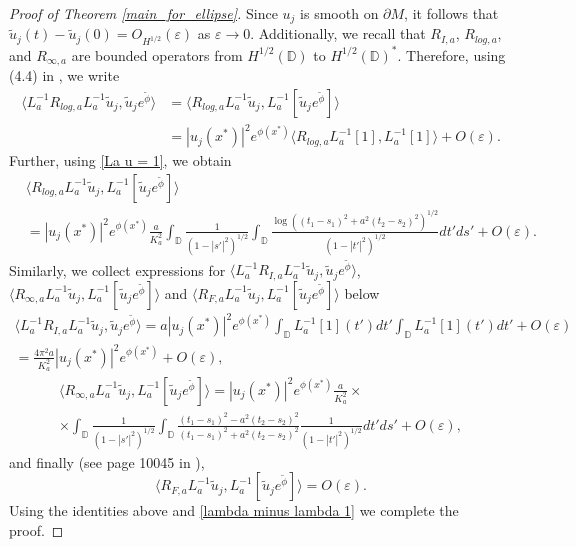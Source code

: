 \documentclass[12pt,a4paper]{amsart}
\numberwithin{equation}{section}
\theoremstyle{plain}
\theoremstyle{definition}
\newcommand{\D}{\mathbb{D}}
\begin{document}
\begin{proof}[Proof of Theorem \ref{main_for_ellipse}]
	
	Since $u_j$ is smooth on $\partial M$, it follows that $\tilde{u}_j(t) - \tilde{u}_j(0) = O_{H^{1/2}}(\varepsilon)$ as $\varepsilon\rightarrow 0$. Additionally, we recall that $R_{I,a}$, $R_{log,a}$, and $R_{\infty,a}$ are bounded operators from $H^{1/2}(\mathbb{D})$ to $H^{1/2}(\mathbb{D})^*$. Therefore, using (4.4) in \cite{NursultanovTzouTzou}, we write
	\begin{align*}
		\langle L_a^{-1} R_{log,a} L_a^{-1}\tilde{u}_j, \tilde{u}_je^{\tilde{\phi}} \rangle &=  \langle  R_{log,a} L_a^{-1}\tilde{u}_j, L_a^{-1}[\tilde{u}_je^{\tilde{\phi}}] \rangle\\
		&= |u_j(x^*)|^2e^{\phi(x^*)}  \langle  R_{log,a} L_a^{-1}[1], L_a^{-1}[1] \rangle + O(\varepsilon).
	\end{align*}
	Further, using \eqref{La u = 1}, we obtain
	\begin{align*}
		&\langle R_{log,a} L_a^{-1}\tilde{u}_j, L_a^{-1}[\tilde{u}_je^{\tilde{\phi}}] \rangle\\
		&= |u_j(x^*)|^2 e^{\phi(x^*)} \frac{a}{K_a^2} \int_{\mathbb{D}} \frac{1}{ (1-|s'|^2)^{1/2}} \int_\D  \frac{\log\left((t_1 - s_1)^2 + a^2 (t_2-s_2)^2 \right)^{1/2}}{ (1-|t'|^2)^{1/2}} dt' ds' + O(\varepsilon).
	\end{align*}
	Similarly, we collect expressions for $\langle L_a^{-1} R_{I,a} L_a^{-1}\tilde{u}_j, \tilde{u}_je^{\tilde{\phi}} \rangle $, $\langle R_{\infty,a} L_a^{-1}\tilde{u}_j, L_a^{-1}[\tilde{u}_je^{\tilde{\phi}}] \rangle$ and $\langle R_{F,a} L_a^{-1}\tilde{u}_j, L_a^{-1}[\tilde{u}_je^{\tilde{\phi}}] \rangle$ below
	\begin{multline*}
		\langle L_a^{-1} R_{I,a} L_a^{-1}\tilde{u}_j, \tilde{u}_je^{\tilde{\phi}} \rangle  = a |u_j(x^*)|^2 e^{\phi(x^*)} \int_{\mathbb{D}} L_a^{-1}[1](t') dt'  \int_{\mathbb{D}} L_a^{-1}[1](t') dt' + O(\varepsilon)\\
		=\frac{4\pi^2a}{K_a^2} |u_j(x^*)|^2 e^{\phi(x^*)} + O(\varepsilon),
	\end{multline*}
	\begin{multline*}
            \langle R_{\infty,a} L_a^{-1}\tilde{u}_j, L_a^{-1}[\tilde{u}_je^{\tilde{\phi}}] \rangle 
		= |u_j(x^*)|^2 e^{\phi(x^*)} \frac{a}{K_a^2} \times \\
            \times \int_{\mathbb{D}} \frac{1}{ (1-|s'|^2)^{1/2}} \int_\D \frac{(t_1 - s_1)^2 - a^2 (t_2 - s_2)^2}{(t_1 - s_1)^2 + a^2 (t_2 - s_2)^2} \frac{1}{ (1-|t'|^2)^{1/2}} dt' ds' + O(\varepsilon),
	\end{multline*}
	and finally (see page 10045 in \cite{NursultanovTradTzou}), 
	\begin{equation*}
		\langle R_{F,a} L_a^{-1}\tilde{u}_j, L_a^{-1}[\tilde{u}_je^{\tilde{\phi}}] \rangle = O(\varepsilon).
	\end{equation*}
	Using the identities above and \eqref{lambda minus lambda 1} we complete the proof.
\end{proof}
\end{document}
